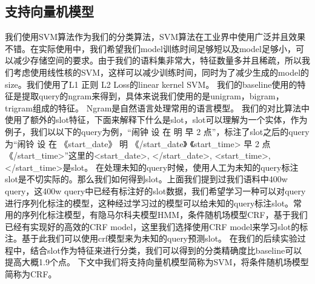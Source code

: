 \documentclass[master]{njuthesis}
\begin{document}
\subsection{支持向量机模型}

我们使用SVM算法作为我们的分类算法，SVM算法在工业界中使用广泛并且效果不错。在实际使用中，我们希望我们model训练时间足够短以及model足够小，可以减少存储空间的要求。由于我们的语料集非常大，特征数量多并且稀疏，所以我们考虑使用线性核的SVM，这样可以减少训练时间，同时为了减少生成的model的size。我们使用了L1 正则 L2 Loss的linear kernel SVM。
我们的baseline使用的特征是提取query的ngram来得到，具体来说我们使用的是unigram，bigram，trigram组成的特征。
Ngram是自然语言处理常用的语言模型。
我们的对比算法中使用了额外的slot特征，下面来解释下什么是slot，slot可以理解为一个实体，作为例子，我们以以下的query为例，“闹钟 设 在 明 早 2 点”，标注了slot之后的query为“闹铃 设 在 《start\_date》 明 《/start\_date》 《start\_time>  早 2 点 《/start\_time>”这里的<start\_date>, </start\_date>, <start\_time>, </start\_time>是slot。
在处理未知的query时候，使用人工为未知的query标注slot是不切实际的。那么我们如何得到slot。上面我们提到过我们语料中400w query，这400w query中已经有标注好的slot数据，我们希望学习一种可以对query进行序列化标注的模型，这种经过学习过的模型可以给未知的query标注slot。常用的序列化标注模型，有隐马尔科夫模型HMM，条件随机场模型CRF，基于我们已经有实现好的高效的CRF model，这里我们选择使用CRF model来学习slot的标注。基于此我们可以使用crf模型来为未知的query预测slot。
在我们的后续实验过程中，结合slot作为特征来进行分类，我们可以得到的分类精确度比baseline可以提高大概1.9个点。
下文中我们将支持向量机模型简称为SVM，将条件随机场模型简称为CRF。
\end{document}
